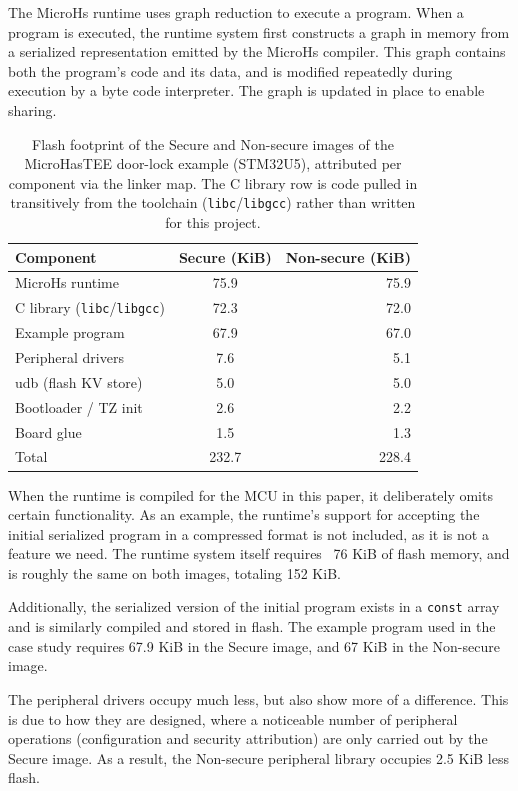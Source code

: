 \documentclass[sigconf]{acmart}
\begin{document}
The MicroHs runtime uses graph reduction to execute a program.
When a program is executed, the runtime system first constructs a graph in memory from a serialized representation emitted by the MicroHs compiler.
This graph contains both the program's code and its data, and is modified repeatedly during execution by a byte code interpreter.
The graph is updated in place to enable sharing.

\begin{table}[ht]
  \caption{Flash footprint of the Secure and Non-secure images of the MicroHasTEE door-lock example (STM32U5), attributed per component via the linker map.
           The C library row is code pulled in transitively from the toolchain (\texttt{libc}/\texttt{libgcc}) rather than written for this project.}
  \label{table:flash-requirement}
  \centering
  \begin{tabular}{lcr}
    \toprule
    Component & Secure (KiB) & Non-secure (KiB) \\
    \midrule
    MicroHs runtime & 75.9 & 75.9 \\
    C library (\texttt{libc}/\texttt{libgcc}) & 72.3 & 72.0 \\
    Example program & 67.9 & 67.0 \\
    Peripheral drivers & 7.6 & 5.1 \\
    udb (flash KV store) & 5.0 & 5.0 \\
    Bootloader / TZ init & 2.6 & 2.2 \\
    Board glue & 1.5 & 1.3 \\
    \midrule
    Total & 232.7 & 228.4 \\
    \bottomrule
  \end{tabular}
\end{table}

When the runtime is compiled for the MCU in this paper, it deliberately omits certain functionality.
As an example, the runtime's support for accepting the initial serialized program in a compressed format is not included, as it is not a feature we need.
The runtime system itself requires ~76 KiB of flash memory, and is roughly the same on both images, totaling 152 KiB.

Additionally, the serialized version of the initial program exists in a \texttt{const} array and is similarly compiled and stored in flash.
The example program used in the case study requires 67.9 KiB in the Secure image, and 67 KiB in the Non-secure image.

The peripheral drivers occupy much less, but also show more of a difference.
This is due to how they are designed, where a noticeable number of peripheral operations (configuration and security attribution) are only carried out by the Secure image.
As a result, the Non-secure peripheral library occupies 2.5 KiB less flash.
\end{document}
